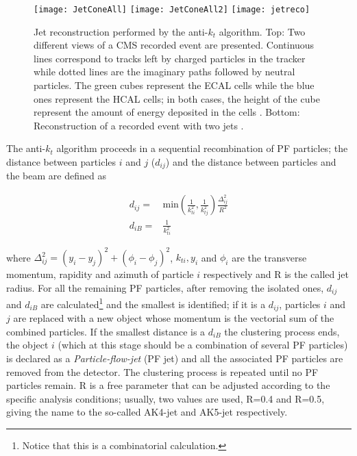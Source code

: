 \begin{figure}[!h]
  \centering
  \texttt{[image: JetConeAll]}
  \texttt{[image: JetConeAll2]}
    \texttt{[image: jetreco]}
  \caption[Jet reconstruction.]{Jet reconstruction performed by the anti-$k_t$ algorithm. Top: Two different views of a CMS recorded event are presented. Continuous lines correspond to tracks left by charged particles in the tracker while dotted lines are the imaginary paths followed by neutral particles. The green cubes represent the ECAL cells while the blue ones represent the HCAL cells; in both cases, the height of the cube represent the amount of energy deposited in the cells \cite{jetconeview}. Bottom: Reconstruction of a recorded event with two jets \cite{jetreco}.}\label{fig:jetcone}
\end{figure}

The anti-$k_t$ algorithm proceeds in a sequential recombination of PF particles; the distance between particles $i$ and $j$ ($d_{ij}$)  and the distance between particles and the beam are defined as

\begin{align}\label{cov_der}
  d_{ij} = & \textrm{min}\left(\frac{1}{k_{ti}^2},\frac{1}{k_{tj}^2}\right)\frac{\Delta_{ij}^2}{R^2} \nonumber\\
  d_{iB} = & \frac{1}{k_{ti}^2}
\end{align}

\noindent where $\Delta_{ij}^2=(y_i-y_j)^2 + (\phi_i-\phi_j)^2$, $k_{ti}, y_i$ and $\phi_i$ are the transverse momentum, rapidity and azimuth of particle $i$ respectively and R is the called jet radius. For all the remaining PF particles, after removing the isolated ones, $d_{ij}$ and $d_{iB}$ are calculated\footnote{Notice that this is a combinatorial calculation.} and the smallest is identified; if it is a $d_{ij}$, particles $i$ and $j$ are replaced with a new object whose momentum is the vectorial sum of the combined particles. If the smallest distance is a $d_{iB}$ the clustering process ends, the object $i$ (which at this stage should be a combination of several PF particles) is declared as a \textit{Particle-flow-jet} (PF jet) and all the associated PF particles are removed from the detector. The clustering process is repeated until no PF particles remain. R is a free parameter that can be adjusted according to the specific analysis conditions; usually, two values are used, R=0.4 and R=0.5, giving the name to the so-called AK4-jet and AK5-jet respectively.     

